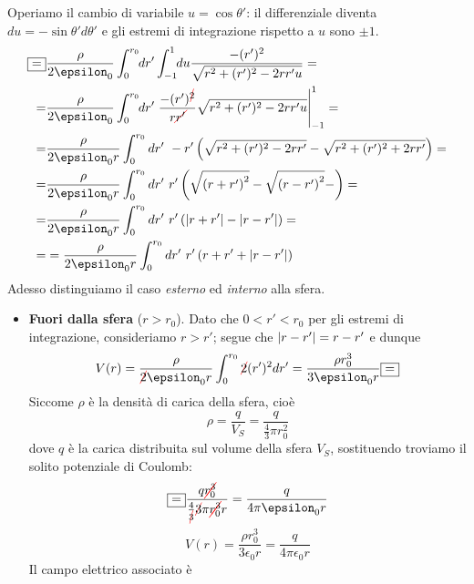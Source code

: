 \begin{examplewt}
	Operiamo il cambio di variabile $u=\cos\theta'$: il differenziale diventa $du=-\sin\theta'd\theta'$ e gli estremi di integrazione rispetto a $u$ sono $\pm 1$.
	\begin{align*}
		\squarequal&\frac{\rho}{2\epsilon_0}\int^{r_0}_0 \negthickspace dr'\int^1_{-1}\negthickspace du \frac{-(r')^2}{\sqrt{r^2+(r')^2-2rr'u}}=\\
		=&\frac{\rho}{2\epsilon_0}\int^{r_0}_0 \negthickspace dr' \eval{\frac{-(r')^{\Ccancel[red]{2}}}{r\Ccancel[red]{r'}} \sqrt{r^2+(r')^2-2rr'u}}^1_{-1}=\\
		=&\frac{\rho}{2\epsilon_0r}\int^{r_0}_0 dr'\ -r'\left(\sqrt{r^2+(r')^2-2rr'}-\sqrt{r^2+(r')^2+2rr'}\right)=\\
		=&\frac{\rho}{2\epsilon_0r}\int^{r_0}_0 dr'\ r'\left(\sqrt{\left(r+r'\right)^2}-\sqrt{\left(r-r'\right)^2}-\right)=\\
		=&\frac{\rho}{2\epsilon_0r}\int^{r_0}_0 dr'\ r'\left(\abs{r+r'}-\abs{r-r'}\right)=\\
		=&=\frac{\rho}{2\epsilon_0r}\int^{r_0}_0 dr'\ r'\left( r+r' + \abs{r-r'} \right)
	\end{align*}
	Adesso distinguiamo il caso \textit{esterno} ed \textit{interno} alla sfera.
	\begin{itemize}
		\item \textbf{Fuori dalla sfera} ($r>r_0$). Dato che $0<r'<r_0$ per gli estremi di integrazione, consideriamo $r>r'$; segue che $\abs{r-r'}=r-r'$ e dunque
		\begin{equation*}
			V(r)=\frac{\rho}{\Ccancel[red]{2}\epsilon_0 r}\int^{r_0}_0 \Ccancel[red]{2} (r')^2 dr'= \frac{\rho r_0^3}{3\epsilon_0 r}\squarequal
		\end{equation*}
		Siccome $\rho$ è la densità di carica della sfera, cioè
		\begin{equation*}
			\rho=\frac{q}{V_S}=\frac{q}{\frac{4}{3} \pi r_0^2}
		\end{equation*}
		dove $q$ è la carica distribuita sul volume della sfera $V_S$, sostituendo troviamo il solito potenziale di Coulomb:
		\begin{equation*}
			\squarequal\frac{q\Ccancel[red]{r_0^3}}{\frac{4}{\Ccancel[red]{3}}\Ccancel[red]{3}\pi \Ccancel[red]{r_0^3} r}=\frac{q}{4\pi \epsilon_0 r}
		\end{equation*}
		\begin{equation}
			V(r)=\frac{\rho r_0^3}{3\epsilon_0 r}=\frac{q}{4\pi \epsilon_0 r}
		\end{equation}
		Il campo elettrico associato è

\end{itemize}
\end{examplewt}
